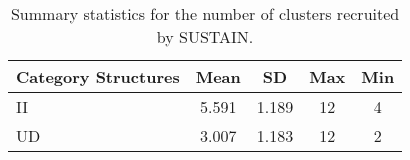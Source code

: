 \begin{table}[H]

\caption{\label{tab:clusters}Summary statistics for the number of clusters
recruited by SUSTAIN.}
\centering
\begin{tabular}[t]{lcccc}
\hline
Category Structures & Mean & SD & Max & Min\\
\hline
II & 5.591 & 1.189 & 12 & 4\\
UD & 3.007 & 1.183 & 12 & 2\\
\hline
\end{tabular}
\end{table}
